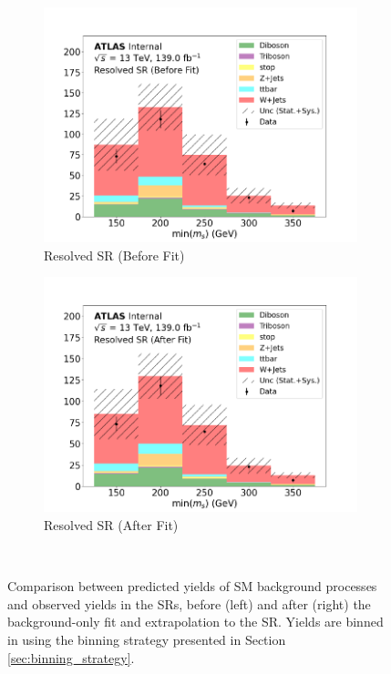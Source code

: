 \begin{figure}[h]
\begin{subfigure}{0.45\textwidth}
    \includegraphics[width=\textwidth]{Figures/8/SR_Resolved_before.pdf}
    \caption{Resolved SR (Before Fit)}\label{fig:before_SR_resolved}
  \end{subfigure} \hspace{1em}
  \begin{subfigure}{0.45\textwidth}
    \includegraphics[width=\textwidth]{Figures/8/SR_Resolved_after.pdf}
    \caption{Resolved SR (After Fit)}\label{fig:after_SR_resolved}
  \end{subfigure} \\ \vspace{1em}
  \caption[]{Comparison between predicted yields of SM background processes and observed yields in the SRs, before (left) and after (right) the background-only fit and extrapolation to the SR. Yields are binned in \minms using the binning strategy presented in Section \ref{sec:binning_strategy}.}
  \label{fig:before_after_SRs}
\end{figure}

